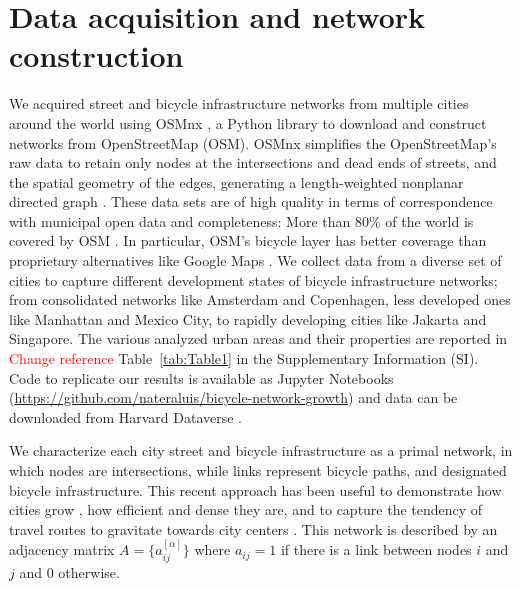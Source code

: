 \section{Data acquisition and network construction}
We acquired street and bicycle infrastructure networks from multiple cities around the world using OSMnx \cite{Boeing2017OSMNX}, a Python library to download and construct networks from OpenStreetMap (OSM). OSMnx simplifies the OpenStreetMap's raw data to retain only nodes at the intersections and dead ends of streets, and the spatial geometry of the edges, generating a length-weighted nonplanar directed graph \cite{Boeing2020Planarity}. These data sets are of high quality \cite{Haklay2010OpenStreetMap,Girres2010Quality} in terms of correspondence with municipal open data \cite{Ferster2019Bicycle} and completeness: More than $80\%$ of the world is covered by OSM \cite{Barbosa-Filho2017Models}. In particular, OSM's bicycle layer has better coverage than proprietary alternatives like Google Maps \cite{Hochmair2012}. We collect data from a diverse set of cities to capture different development states of bicycle infrastructure networks; from consolidated networks like Amsterdam and Copenhagen, less developed ones like Manhattan and Mexico City, to rapidly developing cities like Jakarta and Singapore. The various analyzed urban areas and their properties are reported in \textcolor{red}{Change reference} Table~\ref{tab:Table1} in the Supplementary Information (SI). Code to replicate our results is available as Jupyter Notebooks (\url{https://github.com/nateraluis/bicycle-network-growth}) and data can be downloaded from Harvard Dataverse \cite{natera2019data}.

We characterize each city street and bicycle infrastructure as a primal network, \cite{Porta2006Primal} in which nodes are intersections, while links represent bicycle paths, and designated bicycle infrastructure. This recent approach has been useful to demonstrate how cities grow \cite{Strano2012Evolution,Barthelemy2013Evolution}, how efficient \cite{Gallotti2014Efficiency} and dense they are, and to capture the tendency of travel routes to gravitate towards city centers \cite{Lee2017Morphology}. This network is described by an adjacency matrix $A=\{a_{ij}^{[\alpha]}\}$ where $a_{ij}=1$ if there is a link between nodes $i$ and $j$ and 0 otherwise.

